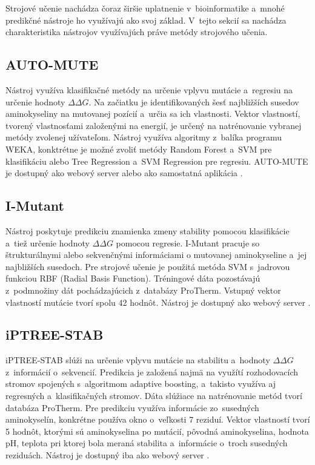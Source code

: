 Strojové učenie nachádza čoraz širšie uplatnenie v~bioinformatike a~mnohé predikčné nástroje ho využívajú ako svoj základ. V~tejto sekcií sa nachádza charakteristika nástrojov využívajúch práve metódy strojového učenia.

\subsection{AUTO-MUTE}

Nástroj využíva klasifikačné metódy na určenie vplyvu mutácie a~regresiu na určenie hodnoty $\Delta\Delta G$.
Na začiatku je identifikovaných šesť najbližších susedov aminokyseliny na mutovanej pozícií a~určia sa ich vlastnosti. Vektor vlastností, tvorený vlastnosťami založenými na energií, je určený na natrénovanie vybranej metódy zvolenej užívateľom. Nástroj využíva algoritmy z~balíka programu WEKA, konktrétne je možné zvoliť metódy Random Forest a~SVM pre klasifikáciu alebo Tree Regression a~SVM Regression pre regresiu. AUTO-MUTE je dostupný ako webový server alebo ako samostatná aplikácia \cite{automute}.

\subsection{I-Mutant}

Nástroj poskytuje predikciu znamienka zmeny stability pomocou klasifikácie a~tiež určenie hodnoty $\Delta\Delta G$ pomocou regresie. I-Mutant pracuje so štrukturálnymi alebo sekvenčnými informáciami o mutovanej aminokyseline a~jej najbližších susedoch. Pre strojové učenie je použitá metóda SVM s~jadrovou funkciou RBF (Radial Basis Function). Tréningové dáta pozostávajú z~podmnožiny dát pochádzajúcich z~databázy ProTherm. Vstupný vektor vlastností mutácie tvorí spolu 42 hodnôt. Nástroj je dostupný ako webový server \cite{imutant}. 

\subsection{iPTREE-STAB}

iPTREE-STAB slúži na určenie vplyvu mutácie na stabilitu a~hodnoty $\Delta\Delta G$ z~informácií o~sekvencií. Predikcia je založená najmä na využítí rozhodovacích stromov spojených s~algoritmom adaptive boosting, a~takisto využíva aj regresných a~klasifikačných stromov. Dáta slúžiace na natrénovanie metód tvorí databáza ProTherm. Pre predikciu využíva informácie zo~susedných aminokyselín, konkrétne používa okno o~veľkosti 7 reziduí. Vektor vlastností tvorí 5 hodnôt, ktorými sú aminokyselina po mutácií, pôvodná aminokyselina, hodnota pH, teplota pri ktorej bola meraná stabilita a~informácie o~troch susedných reziduách. Nástroj je dostupný iba ako webový server \cite{iptree}.

